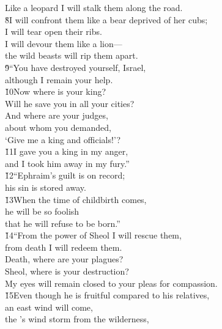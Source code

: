 \begin{poetry}
\poemll    Like a leopard I will stalk them along the road. \\
\poeml \v{8}I will confront them like a bear deprived of her cubs; \\
\poemll    I will tear open their ribs. \\
\poeml I will devour them like a lion--- \\
\poemll    the wild beasts will rip them apart. \\
\poeml \v{9}``You have destroyed yourself, Israel, \\
\poemll    although I remain your help. \\
\poeml \v{10}Now where is your king? \\
\poemll    Will he save you in all your cities? \\
\poeml And where are your judges, \\
\poemll    about whom you demanded, \\
\poemlll       `Give me a king and officials!'? \\
\poeml \v{11}I gave you a king in my anger, \\
\poemll    and I took him away in my fury.'' \\
\poeml \v{12}``Ephraim's guilt is on record; \\
\poemll    his sin is stored away. \\
\poeml \v{13}When the time of childbirth comes, \\
\poemll    he will be so foolish \\
\poemlll       that he will refuse to be born.'' \\
\poeml \v{14}``From the power of Sheol I will rescue them, \\
\poemll    from death I will redeem them. \\
\poeml Death, where are your plagues? \\
\poemll    Sheol, where is your destruction? \\
\poemlll       My eyes will remain closed to your pleas for compassion. \\
\poeml \v{15}Even though he is fruitful compared to his relatives, \\
\poemll    an east wind will come, \\
\poeml the 's wind storm from the wilderness, \\

\end{poetry}
